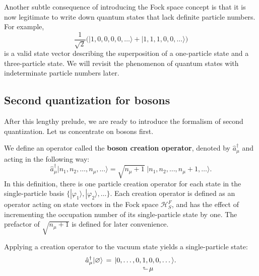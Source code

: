 \documentclass[prx,12pt]{revtex4-2}
\begin{document}
Another subtle consequence of introducing the Fock space concept is
that it is now legitimate to write down quantum states that lack
definite particle numbers.  For example,
\begin{equation*}
  \frac{1}{\sqrt{2}} \Big(|1,0,0,0,0,\dots\rangle + |1,1,1,0,0,\dots\rangle\Big)
\end{equation*}
is a valid state vector describing the superposition of a one-particle
state and a three-particle state.  We will revisit the phenomenon of
quantum states with indeterminate particle numbers later.

\subsection{Second quantization for bosons}
\label{sec:second_quantized_bosons}

After this lengthy prelude, we are ready to introduce the formalism of
second quantization.  Let us concentrate on bosons first.  

We define an operator called the \textbf{boson creation operator},
denoted by $\hat{a}_\mu^\dagger$ and acting in the following way:
\begin{equation}
  \hat{a}_\mu^\dagger \big|n_1, n_2, \dots, n_\mu, \dots\big\rangle = \sqrt{n_\mu+1} \; \big|n_1, n_2, \dots, n_\mu + 1, \dots\big\rangle.
  \label{amu}
\end{equation}
In this definition, there is one particle creation operator for each
state in the single-particle basis
$\{|\varphi_1\rangle,|\varphi_2\rangle,\dots\}$.  Each creation operator is
defined as an operator acting on state vectors in the Fock space
$\mathscr{H}^F_S$, and has the effect of incrementing the occupation
number of its single-particle state by one.  The prefactor of
$\sqrt{n_\mu+1}$ is defined for later convenience.

Applying a creation operator to the vacuum state yields a
single-particle state:
\begin{align}
  \begin{aligned}\hat{a}_\mu^\dagger |\varnothing\rangle \, &= \, |0,\dots,0, 1, 0, 0, \dots\rangle. \\[-1ex] &\qquad\qquad\quad\;\;\rotatebox[origin=c]{90}{$\Rsh$}\,\mu
  \end{aligned}
\end{align}
\end{document}
